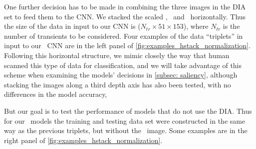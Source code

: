One further decision has to be made in combining the three images in the DIA set to feed them to the CNN. We stacked the scaled \diff, \search\ and \temp\ horizontally. %
Thus the size of the data in input to our CNN is ($N_{tr}\times51\times153$), where $N_{tr}$ is the number of transients to be considered. Four examples of the data ``triplets'' in input to our \diabased\ CNN are in the left panel of \autoref{fig:examples_hstack_normalization}. Following this horizontal structure, we mimic closely the way that human scanned this type of data for classification, and we will take advantage of this scheme when examining the models' decisions in \autoref{subsec: saliency}, although stacking the images along a third depth axis has also been tested, with no differences in the model accuracy,   %

But our goal is to test the performance of models that do not use the DIA. Thus for our \nodia\ models the training and testing data set were constructed in the same way as the previous triplets, but without the \diff\ image. Some examples are in the right panel of \autoref{fig:examples_hstack_normalization}.




